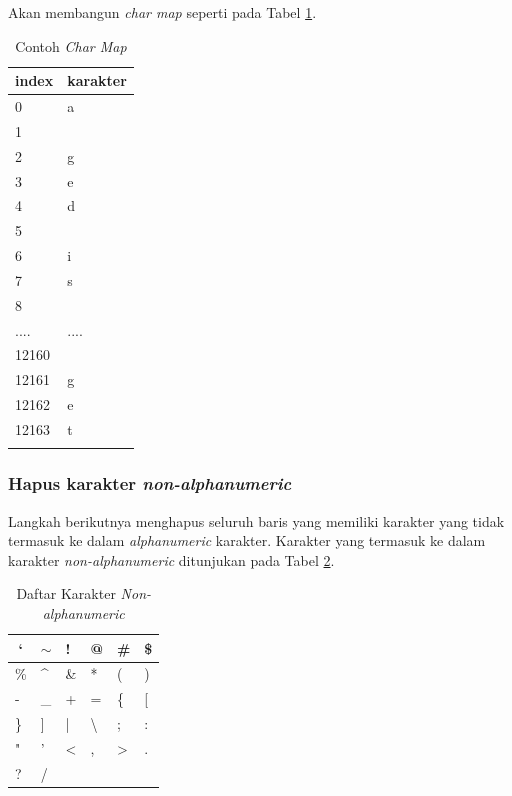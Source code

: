 \documentclass[../Book.tex]{subfiles}
\begin{document}
	\noindent Akan membangun \textit{char map} seperti pada Tabel \ref{example-charmap}.
	
	\begin{table}[H]
		\centering
		\caption{Contoh \textit{Char Map}}
		\label{example-charmap}
		\begin{tabular}{ll}
			\hline
			index & karakter \\ \hline
			0     & a        \\
			1     &        \\
			2     & g        \\
			3     & e        \\
			4     & d       \\
			5     &          \\
			6     & i        \\
			7     & s \\
			8	  & \\
			....  & ....\\
			12160 & \\
			12161 & g \\
			12162 & e \\
			12163 & t \\
			 \\ \bottomrule
		\end{tabular}
	\end{table}

	\subsubsection{Hapus karakter \textit{non-alphanumeric}}
	\noindent Langkah berikutnya menghapus seluruh baris yang memiliki karakter yang tidak termasuk ke dalam \textit{alphanumeric} karakter. Karakter yang termasuk ke dalam karakter \textit{non-alphanumeric} ditunjukan pada Tabel \ref{nonalphanumeric}.
	
	\begin{table}[H]
		\centering
		\caption{Daftar Karakter\textit{ Non-alphanumeric}}
		\label{nonalphanumeric}
		\begin{tabular}{|l|l|l|l|l|l|}
			\hline
			\multicolumn{1}{|c|}{`} & \multicolumn{1}{c|}{$\sim$} & !         & @              & \#           & \$   \\ \hline
			\%                      & \textasciicircum            & \&        & *              & (            & )   \\ \hline
			-                       & \_                          & +         & =              & \{           & {[} \\ \hline
			\}                      & {]}                         & |         & \textbackslash & ;            & :   \\ \hline
			"                       & '                           & \textless & ,              & \textgreater & .   \\ \hline
			?                       & /                           &           &                &              &     \\ \hline
		\end{tabular}
	\end{table}
\end{document}
